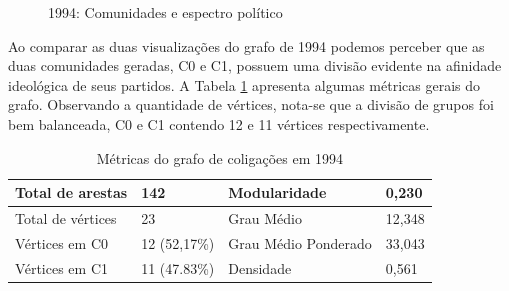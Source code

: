 \begin{figure}[H]
\center
    \qquad

    \caption{1994: Comunidades e espectro político}
\end{figure}

Ao comparar as duas visualizações do grafo de 1994 podemos perceber que as duas comunidades geradas, C0 e C1, possuem uma divisão evidente na afinidade ideológica de seus partidos. A Tabela \ref{table-1994} apresenta algumas métricas gerais do grafo. Observando a quantidade de vértices, nota-se que a divisão de grupos foi bem balanceada, C0 e C1 contendo 12 e 11 vértices respectivamente.

\begin{table}[H]
\centering
\label{table-1994}
\begin{tabular}{|l|l|l|l|}
\hline
Total de arestas  & 142 & Modularidade         & 0,230 \\ \hline
Total de vértices & 23   & Grau Médio           & 12,348 \\ \hline
Vértices em C0    & 12 (52,17\%)  & Grau Médio Ponderado & 33,043 \\ \hline
Vértices em C1    & 11 (47.83\%) & Densidade            &  0,561\\ \hline
\end{tabular}
\caption{Métricas do grafo de coligações em 1994}
\end{table}

